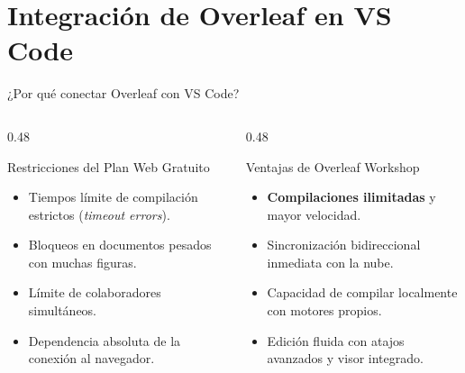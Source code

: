 \documentclass[aspectratio=169, 10pt]{beamer}
\begin{document}
\section[Overleaf en IDE]{Integración de Overleaf en VS Code}

\begin{frame}{¿Por qué conectar Overleaf con VS Code?}
  \begin{columns}[T]
    \begin{column}{0.48\textwidth}
      \begin{alertblock}{Restricciones del Plan Web Gratuito}
        \small
        \begin{itemize}
          \item Tiempos límite de compilación estrictos (\textit{timeout errors}).
          \item Bloqueos en documentos pesados con muchas figuras.
          \item Límite de colaboradores simultáneos.
          \item Dependencia absoluta de la conexión al navegador.
        \end{itemize}
      \end{alertblock}
    \end{column}

    \begin{column}{0.48\textwidth}
      \begin{exampleblock}{Ventajas de Overleaf Workshop}
        \small
        \begin{itemize}
          \item \textbf{Compilaciones ilimitadas} y mayor velocidad.
          \item Sincronización bidireccional inmediata con la nube.
          \item Capacidad de compilar localmente con motores propios.
          \item Edición fluida con atajos avanzados y visor integrado.
        \end{itemize}
      \end{exampleblock}
    \end{column}
  \end{columns}
\end{frame}
\end{document}
